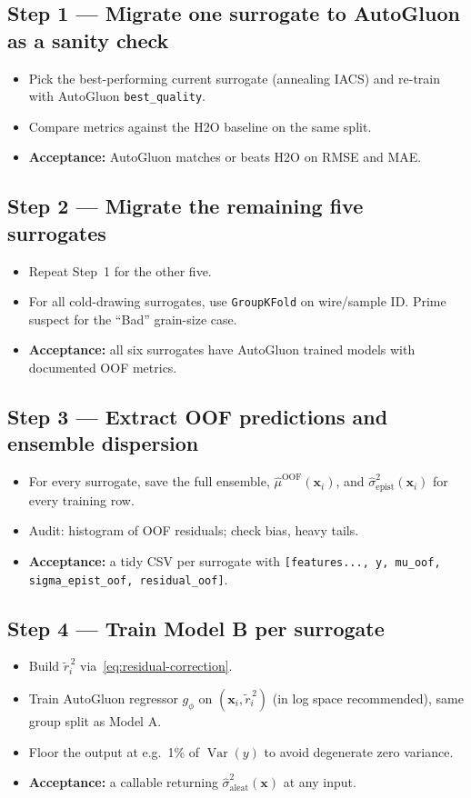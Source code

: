 \documentclass[11pt,a4paper]{article}
\DeclareMathOperator{\Var}{Var}
\begin{document}
\subsection*{Step 1 --- Migrate one surrogate to AutoGluon as a sanity check}
\begin{itemize}
    \item Pick the best-performing current surrogate (annealing IACS) and re-train with AutoGluon \texttt{best\_quality}.
    \item Compare metrics against the H2O baseline on the same split.
    \item \textbf{Acceptance:} AutoGluon matches or beats H2O on RMSE and MAE.
\end{itemize}

\subsection*{Step 2 --- Migrate the remaining five surrogates}
\begin{itemize}
    \item Repeat Step~1 for the other five.
    \item For all cold-drawing surrogates, use \texttt{GroupKFold} on wire/sample ID. Prime suspect for the ``Bad'' grain-size case.
    \item \textbf{Acceptance:} all six surrogates have AutoGluon trained models with documented OOF metrics.
\end{itemize}

\subsection*{Step 3 --- Extract OOF predictions and ensemble dispersion}
\begin{itemize}
    \item For every surrogate, save the full ensemble, $\hat\mu^{\text{OOF}}(\bm x_i)$, and $\hat\sigma^2_{\text{epist}}(\bm x_i)$ for every training row.
    \item Audit: histogram of OOF residuals; check bias, heavy tails.
    \item \textbf{Acceptance:} a tidy CSV per surrogate with \texttt{[features..., y, mu\_oof, sigma\_epist\_oof, residual\_oof]}.
\end{itemize}

\subsection*{Step 4 --- Train Model B per surrogate}
\begin{itemize}
    \item Build $\tilde r_i^{\,2}$ via~\eqref{eq:residual-correction}.
    \item Train AutoGluon regressor $g_\phi$ on $(\bm x_i, \tilde r_i^{\,2})$ (in log space recommended), same group split as Model A.
    \item Floor the output at e.g.\ 1\% of $\Var(y)$ to avoid degenerate zero variance.
    \item \textbf{Acceptance:} a callable returning $\hat\sigma^2_{\text{aleat}}(\bm x)$ at any input.
\end{itemize}
\end{document}
